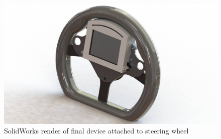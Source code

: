 \begin{figure}[H]
\begin{center}
\includegraphics[width=12cm]{Figures/device_render_wheel.jpg}
\end{center}
\caption{SolidWorks render of final device attached to steering wheel}
\label{fig:device_render_wheel}
\end{figure}
